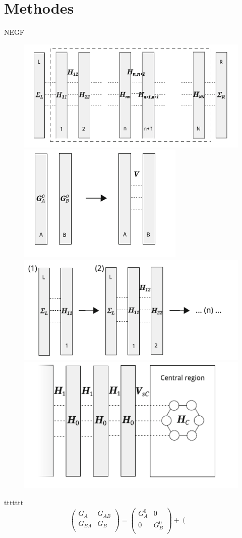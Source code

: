\documentclass[handout,t]{beamer}
\begin{document}
\section{Methodes}
\begin{frame}{NEGF}
	\begin{figure}
    \centering
    \includegraphics[width=0.25\linewidth]{../figures/iteration.png}
    \includegraphics[width=0.25\linewidth]{../figures/greendyson.png}
    \includegraphics[width=0.25\linewidth]{../figures/iterationchannelgreen.png}
    \includegraphics[width=0.25\linewidth]{../figures/leaditerationgreen.png}
    \label{fig:greendyson}
\end{figure}
ttttttt
\begin{equation}
    \left( \begin{matrix}
           {{G}_{A}} & {{G}_{AB}}  \\
           {{G}_{BA}} & {{G}_{B}}  \\
        \end{matrix} \right)=\left( \begin{matrix}
           G_{A}^{0} & 0  \\
           0 & G_{B}^{0}  \\
        \end{matrix} \right)+\left( \begin{matrix}

\end{matrix}
\end{equation}
\end{frame}
\end{document}
